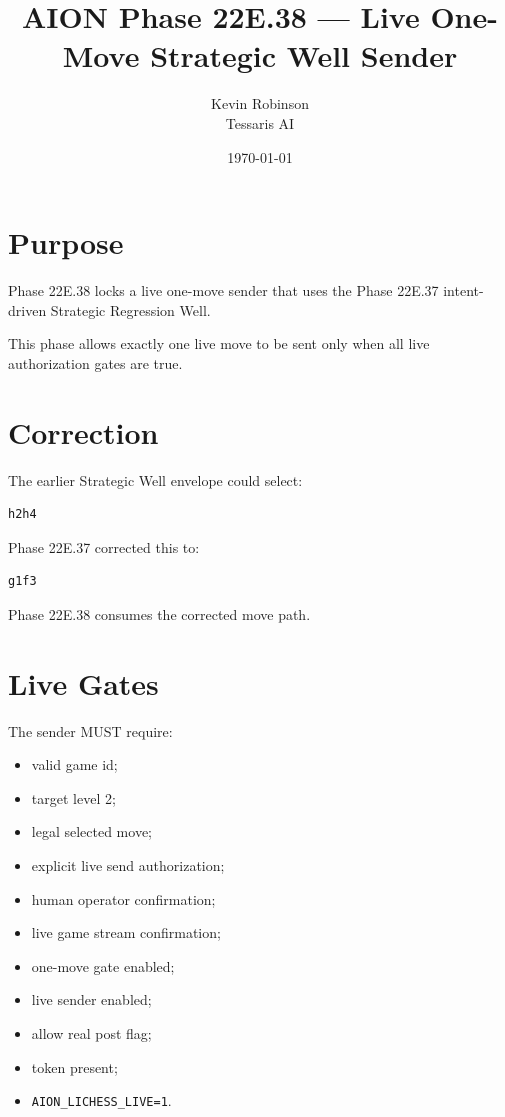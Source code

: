 \documentclass[11pt,a4paper]{article}
\title{\textbf{AION Phase 22E.38 --- Live One-Move Strategic Well Sender}}
\author{Kevin Robinson\\Tessaris AI}
\date{\today}
\begin{document}
\maketitle

\section{Purpose}

Phase 22E.38 locks a live one-move sender that uses the Phase 22E.37 intent-driven Strategic Regression Well.

This phase allows exactly one live move to be sent only when all live authorization gates are true.

\section{Correction}

The earlier Strategic Well envelope could select:

\begin{verbatim}
h2h4
\end{verbatim}

Phase 22E.37 corrected this to:

\begin{verbatim}
g1f3
\end{verbatim}

Phase 22E.38 consumes the corrected move path.

\section{Live Gates}

The sender MUST require:

\begin{itemize}[leftmargin=*]
  \item valid game id;
  \item target level 2;
  \item legal selected move;
  \item explicit live send authorization;
  \item human operator confirmation;
  \item live game stream confirmation;
  \item one-move gate enabled;
  \item live sender enabled;
  \item allow real post flag;
  \item token present;
  \item \texttt{AION\_LICHESS\_LIVE=1}.
\end{itemize}
\end{document}
